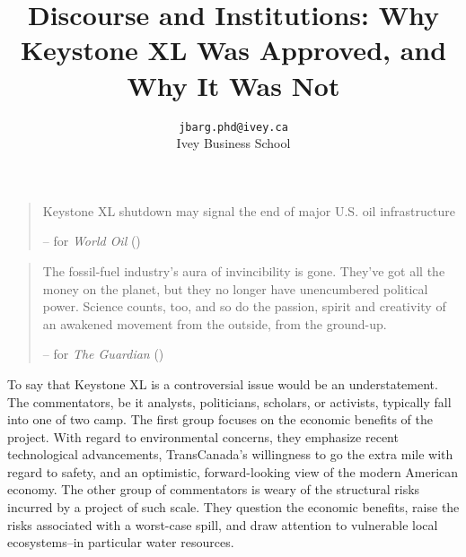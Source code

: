 \documentclass{article}
\title{Discourse and Institutions: Why Keystone XL Was Approved, and Why It Was Not}
\author{
	\texttt{jbarg.phd@ivey.ca}\\
	Ivey Business School
}
\begin{document}
	\maketitle
	\clearpage



	\begin{quote}
		Keystone XL shutdown may signal the end of major U.S. oil infrastructure

		-- \citeauthor{Freitas2021} for \textit{World Oil} (\citeyear{Freitas2021})
	\end{quote}

	\begin{quote}
		The fossil-fuel industry’s aura of invincibility is gone. They’ve got all the money on the planet, but they no longer have unencumbered political power. Science counts, too, and so do the passion, spirit and creativity of an awakened movement from the outside, from the ground-up.

		-- \citeauthor{McKibben2015} for \textit{The Guardian} (\citeyear{McKibben2015})
	\end{quote}

	To say that Keystone XL is a controversial issue would be an understatement. The commentators, be it analysts, politicians, scholars, or activists, typically fall into one of two camp. The first group focuses on the economic benefits of the project. With regard to environmental concerns, they emphasize recent technological advancements, TransCanada's willingness to go the extra mile with regard to safety, and an optimistic, forward-looking view of the modern American economy. The other group of commentators is weary of the structural risks incurred by a project of such scale. They question the economic benefits, raise the risks associated with a worst-case spill, and draw attention to vulnerable local ecosystems--in particular water resources.
	
\end{document}
